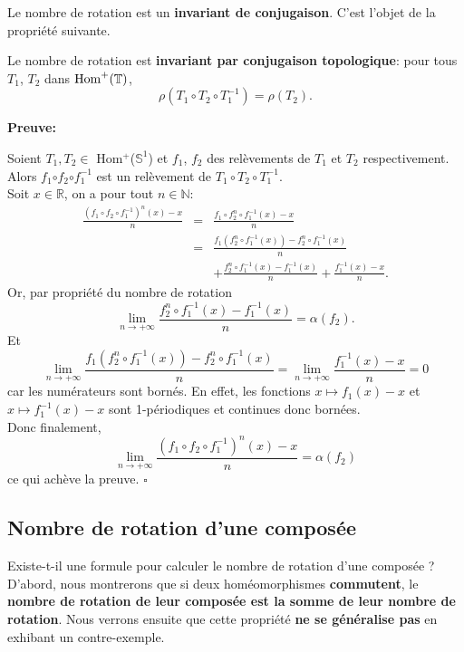 Le nombre de rotation est un \textbf{invariant de conjugaison}. C'est l'objet de la propriété suivante.






\begin{proposition}\label{conjugaison}
		Le nombre de rotation est \textbf{invariant par conjugaison topologique}: pour tous $T_1$, $T_2$ dans $\mathrm{Hom}^+({\mathbb{T}})$,
			$$\rho(T_{1}\circ T_{2}\circ T_{1}^{-1})=\rho(T_{2}).$$
\end{proposition}

\textbf{Preuve:}
	\par Soient $T_{1}, T_{2} \in$ Hom$^+$($\mathbb{S}^{1}$) et $f_{1}$, $f_{2}$ des relèvements de $T_{1}$ et $T_{2}$ respectivement.\\
	Alors $f_{1}$$\circ$$f_{2}$$\circ$$f_{1}^{-1}$ est un relèvement de $T_{1}\circ T_{2}\circ T_{1}^{-1}$.\\
	Soit $x \in \mathbb{R}$, on a pour tout $n \in \mathbb{N}$:
	\begin{eqnarray*}
		\frac{(f_{1}\circ f_2 \circ f_1^{-1})^n(x)-x}{n} &=& \frac{f_{1}\circ f_2^n \circ f_1^{-1}(x)-x}{n}\\
		&=& \frac{f_1(f_2^n\circ f_1^{-1}(x)) - f_2^n\circ f_1^{-1}(x)}{n}\\
		 &&+ \frac{f_2^n\circ f_1^{-1}(x) - f_1^{-1}(x)}{n}+ \frac{f_1^{-1}(x) - x}{n}.
	\end{eqnarray*}
	Or, par propriété du nombre de rotation $$\underset{n \to +\infty}{\lim}\frac{f_2^n\circ f_1^{-1}(x) - f_1^{-1}(x)}{n} = \alpha(f_2).$$
	Et  $$\underset{n \to +\infty}{\lim} \frac{f_1(f_2^n\circ f_1^{-1}(x)) - f_2^n\circ f_1^{-1}(x)}{n} = \underset{n \to +\infty}{\lim} \frac{f_1^{-1}(x) - x}{n} = 0$$ car les numérateurs sont bornés. En effet, les fonctions $x \mapsto f_1(x)-x$ et $x\mapsto f_1^{-1}(x)-x$ sont 1-périodiques et continues donc bornées.\\
	Donc finalement, $$\underset{n \to +\infty}{\lim} 	\frac{(f_{1}\circ f_2 \circ f_1^{-1})^n(x)-x}{n} =\alpha(f_2)$$ ce qui achève la preuve. \hfill $\square$








\subsection{Nombre de rotation d'une composée}
Existe-t-il une formule pour calculer le nombre de rotation d'une composée ? D'abord, nous montrerons que si deux homéomorphismes \textbf{commutent}, le \textbf{nombre de rotation de leur composée est la somme de leur nombre de rotation}. Nous verrons ensuite que cette propriété \textbf{ne se généralise pas} en exhibant un contre-exemple.


